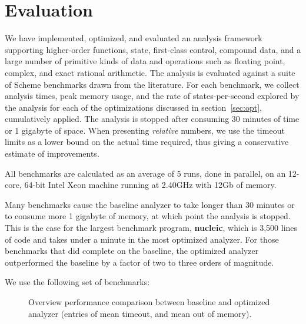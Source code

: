 \documentclass[preprint,onecolumn,9pt]{sigplanconf} %
\begin{document}
\section{Evaluation}
\label{sec:eval}

We have implemented, optimized, and evaluated an analysis framework
supporting higher-order functions, state, first-class control,
compound data, and a large number of primitive kinds of data and
operations such as floating point, complex, and exact rational
arithmetic.  The analysis is evaluated against a suite of Scheme benchmarks
drawn from the literature.
%
For each benchmark, we collect analysis times, peak memory usage, and
the rate of states-per-second explored by the analysis for each of the
optimizations discussed in section~\ref{sec:opt}, cumulatively
applied.  The analysis is stopped after consuming 30 minutes of time
or 1 gigabyte of space.  When presenting \emph{relative} numbers, we
use the timeout limits as a lower bound on the actual time required,
thus giving a conservative estimate of improvements.

All benchmarks are calculated as an average of 5 runs, done in
parallel, on an 12-core, 64-bit Intel Xeon machine running at 2.40GHz
with 12Gb of memory.

Many benchmarks cause the baseline analyzer to take longer than 30
minutes or to consume more 1 gigabyte of memory, at which point the
analysis is stopped.  This is the case for the largest benchmark
program, {\bf nucleic}, which is 3,500 lines of code and takes under a minute in the
most optimized analyzer.  For those benchmarks that did complete on
the baseline, the optimized analyzer outperformed the baseline by a
factor of two to three orders of magnitude.

We use the following set of benchmarks:
\begin{figure}
\centering

\caption{Overview performance comparison between baseline and
  optimized analyzer (entries of  mean timeout, and  mean out of memory).}
\label{fig:bench-overview}
\end{figure}
\end{document}
